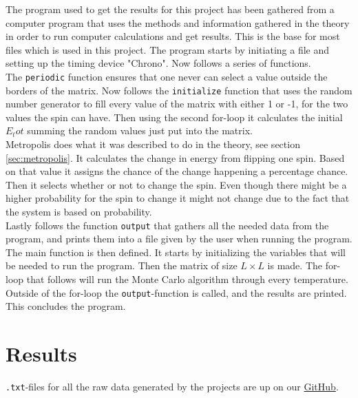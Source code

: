 \documentclass{article}
\begin{document}
The program used to get the results for this project has been gathered from a computer program that uses the methods and information gathered in the theory in order to run computer calculations and get results. This is the base for most files which is used in this project.  The program starts by initiating a file and setting up the timing device "Chrono". Now follows a series of functions. \\

The \texttt{periodic} function ensures that one never can select a value outside the borders of the matrix. Now follows the \texttt{initialize} function that uses the random number generator to fill every value of the matrix with either 1 or -1, for the two values the spin can have. Then using the second for-loop it calculates the initial $E_tot$ summing the random values just put into the matrix. \\

Metropolis does what it was described to do in the theory, see section \ref{sec:metropolis}. It calculates the change in energy from flipping one spin. Based on that value it assigns the chance of the change happening a percentage chance. Then it selects whether or not to change the spin. Even though there might be a higher probability for the spin to change it might not change due to the fact that the system is based on probability. \\

Lastly follows the function \texttt{output} that gathers all the needed data from the program, and prints them into a file given by the user when running the program. \\

The main function is then defined. It starts by initializing the variables that will be needed to run the program. Then the matrix of size $L \times L$ is made. The for-loop that follows will run the Monte Carlo algorithm through every temperature. Outside of the for-loop the \texttt{output}-function is called, and the results are printed. This concludes the program. \\


\vspace{1cm}

\section{Results} \label{sec:Results}

\texttt{.txt}-files for all the raw data generated by the projects are up on our \href{https://github.com/Erikbgram/Fys3150}{GitHub}. \\
\end{document}
